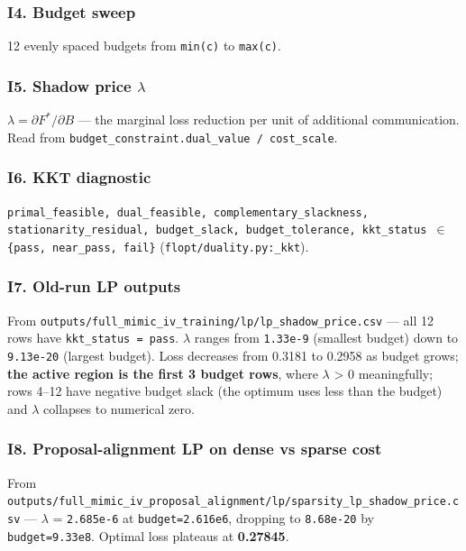 \documentclass{article}
\begin{document}
\subsubsection{I4. Budget sweep}


12 evenly spaced budgets from \texttt{min(c)} to \texttt{max(c)}.


\subsubsection{I5. Shadow price \ensuremath{\lambda}}


\(\lambda = \partial F^* / \partial B\) --- the marginal loss reduction per unit of additional communication. Read from \texttt{budget\_constraint.dual\_value / cost\_scale}.


\subsubsection{I6. KKT diagnostic}


\texttt{primal\_feasible, dual\_feasible, complementary\_slackness, stationarity\_residual, budget\_slack, budget\_tolerance, kkt\_status \ensuremath{\in} \{pass, near\_pass, fail\}} (\texttt{flopt/duality.py:\_kkt}).


\subsubsection{I7. Old-run LP outputs}


From \texttt{outputs/full\_mimic\_iv\_training/lp/lp\_shadow\_price.csv} --- all 12 rows have \texttt{kkt\_status = pass}. \ensuremath{\lambda} ranges from \texttt{1.33e-9} (smallest budget) down to \texttt{9.13e-20} (largest budget). Loss decreases from 0.3181 to 0.2958 as budget grows; \textbf{the active region is the first 3 budget rows}, where \ensuremath{\lambda} > 0 meaningfully; rows 4--12 have negative budget slack (the optimum uses less than the budget) and \ensuremath{\lambda} collapses to numerical zero.


\subsubsection{I8. Proposal-alignment LP on dense vs sparse cost}


From \texttt{outputs/full\_mimic\_iv\_proposal\_alignment/lp/sparsity\_lp\_shadow\_price.csv} --- \ensuremath{\lambda} = \texttt{2.685e-6} at \texttt{budget=2.616e6}, dropping to \texttt{8.68e-20} by \texttt{budget=9.33e8}. Optimal loss plateaus at \textbf{0.27845}.
\end{document}
